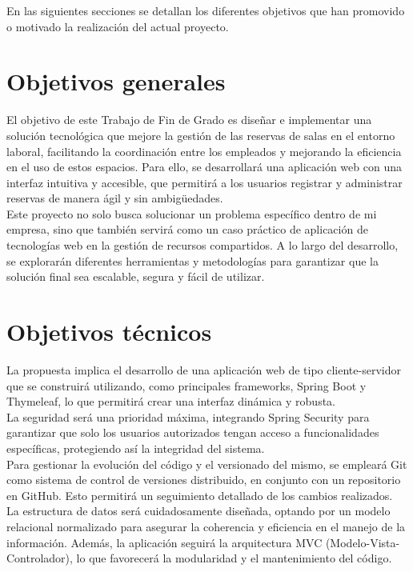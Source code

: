 
En las siguientes secciones se detallan los diferentes objetivos que han promovido o motivado la realización del actual proyecto.

\section{Objetivos generales}\label{objetivos-generales}
El objetivo de este Trabajo de Fin de Grado es diseñar e implementar una solución tecnológica que mejore la gestión de las reservas de salas en el entorno laboral, facilitando la coordinación entre los empleados y mejorando la eficiencia en el uso de estos espacios. Para ello, se desarrollará una aplicación web con una interfaz intuitiva y accesible, que permitirá a los usuarios registrar y administrar reservas de manera ágil y sin ambigüedades.\\

Este proyecto no solo busca solucionar un problema específico dentro de mi empresa, sino que también servirá como un caso práctico de aplicación de tecnologías web en la gestión de recursos compartidos. A lo largo del desarrollo, se explorarán diferentes herramientas y metodologías para garantizar que la solución final sea escalable, segura y fácil de utilizar.

\section{Objetivos técnicos}\label{objetivos-tecnicos}
La propuesta implica el desarrollo de una aplicación web de tipo cliente-servidor que se construirá utilizando, como principales frameworks, Spring Boot y Thymeleaf, lo que permitirá crear una interfaz dinámica y robusta.\\

La seguridad será una prioridad máxima, integrando Spring Security para garantizar que solo los usuarios autorizados tengan acceso a funcionalidades específicas, protegiendo así la integridad del sistema.\\

Para gestionar la evolución del código y el versionado del mismo, se empleará Git como sistema de control de versiones distribuido, en conjunto con un repositorio en GitHub. Esto permitirá un seguimiento detallado de los cambios realizados.\\

La estructura de datos será cuidadosamente diseñada, optando por un modelo relacional normalizado para asegurar la coherencia y eficiencia en el manejo de la información. Además, la aplicación seguirá la arquitectura MVC (Modelo-Vista-Controlador), lo que favorecerá la modularidad y el mantenimiento del código.\\

